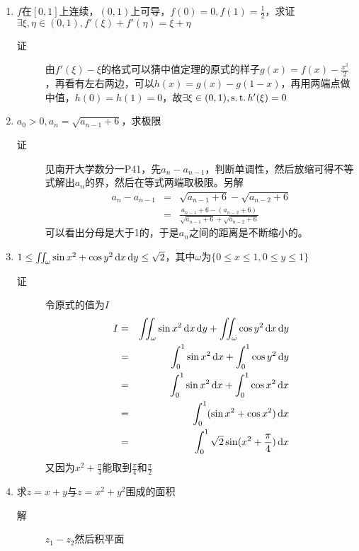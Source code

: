 \begin{enumerate}
\item $f$在$[0,1]$上连续，$(0,1)$上可导，$f(0)=0,f(1)=\frac{1}{2}$，求证$\exists \xi,\eta \in (0,1),f'(\xi)+f'(\eta)=\xi+\eta$
\begin{description}
\item[证] 由$f'(\xi)-\xi$的格式可以猜中值定理的原式的样子$g(x)=f(x)-\frac{x^2}{2}$，再看有左右两边，可以$h(x)=g(x)-g(1-x)$，再用两端点做中值，$h(0)=h(1)=0$，故$\exists \xi \in (0,1),\operatorname{s.t.} h'(\xi)=0$
\end{description}

\item $a_0 > 0,a_n=\sqrt{a_{n-1}+6}$，求极限
\begin{description}
\item[证] 见南开大学数分一P41，先$a_n-a_{n-1}$，判断单调性，然后放缩可得不等式解出$a_n$的界，然后在等式两端取极限。另解
\begin{eqnarray*}
a_n-a_{n-1} &=& \sqrt{a_{n-1}+6} - \sqrt{a_{n-2}+6}\\
&=& \frac{a_{n-1}+6-(a_{n-2}+6)}{\sqrt{a_{n-1}+6} + \sqrt{a_{n-2}+6}}
\end{eqnarray*}
可以看出分母是大于1的，于是$a_n$之间的距离是不断缩小的。
\end{description}

\item $1\leq \iint_\omega \sin x^2+\cos y^2 \,\mathrm{d} x \,\mathrm{d} y\leq \sqrt{2}$，其中$\omega$为$\{0\leq x\leq 1,0\leq y\leq 1\}$
\begin{description}
\item[证] 令原式的值为$I$
\begin{eqnarray*}
I & = & \iint_\omega \sin x^2 \,\mathrm{d} x \,\mathrm{d} y+\iint_\omega \cos y^2 \,\mathrm{d} x \,\mathrm{d} y\\
& = & \int_0^1 \sin x^2 \,\mathrm{d} x + \int_0^1 \cos y^2 \,\mathrm{d} y\\
& = & \int_0^1 \sin x^2 \,\mathrm{d} x + \int_0^1 \cos x^2 \,\mathrm{d} x\\
& = & \int_0^1 (\sin x^2 + \cos x^2) \,\mathrm{d} x\\
& = & \int_0^1 \sqrt{2}\sin (x^2+\frac{\pi}{4}) \,\mathrm{d} x
\end{eqnarray*}
又因为$x^2+\frac{\pi}{4}$能取到$\frac{\pi}{4}$和$\frac{\pi}{2}$
\end{description}

\item 求$z=x+y$与$z=x^2+y^2$围成的面积
\begin{description}
\item[解] $z_1-z_2$然后积平面
\end{description}


\end{enumerate}
